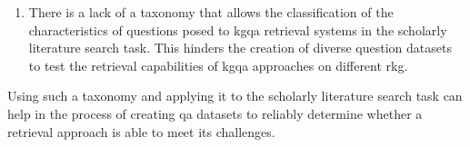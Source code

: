\begin{enumerate}[label=\textbf{P\arabic*}, leftmargin=2.5em, start=2]
    \item \label{enum:p2} There is a lack of a taxonomy that allows the classification of the characteristics of questions posed to \gls{kgqa} retrieval systems in the scholarly literature search task. This hinders the creation of diverse question datasets to test the retrieval capabilities of \gls{kgqa} approaches on different \gls{rkg}. 
\end{enumerate}

Using such a taxonomy and applying it to the scholarly literature search task can help in the process of creating \gls{qa} datasets to reliably determine whether a retrieval approach is able to meet its challenges.